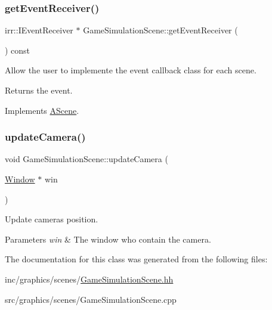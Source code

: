 \subsubsection{\texorpdfstring{get\+Event\+Receiver()}{getEventReceiver()}}
{\footnotesize\ttfamily irr\+::\+I\+Event\+Receiver $\ast$ Game\+Simulation\+Scene\+::get\+Event\+Receiver (\begin{DoxyParamCaption}{ }\end{DoxyParamCaption}) const\hspace{0.3cm}{\ttfamily [virtual]}}



Allow the user to implemente the event callback class for each scene. 

\begin{DoxyReturn}{Returns}
the event. 
\end{DoxyReturn}


Implements \hyperlink{classAScene_af521e5e6d30a5d2e5d30eb333e4d3abd}{A\+Scene}.

\mbox{\label{classGameSimulationScene_a66b107f708b5eed87a3c0a0016541d29}} 
\subsubsection{\texorpdfstring{update\+Camera()}{updateCamera()}}
{\footnotesize\ttfamily void Game\+Simulation\+Scene\+::update\+Camera (\begin{DoxyParamCaption}\item[{\hyperlink{classWindow}{Window} $\ast$}]{win }\end{DoxyParamCaption})}



Update camera\textquotesingle{}s position. 


\begin{DoxyParams}{Parameters}
{\em win} & The window who contain the camera. \\
\hline
\end{DoxyParams}


The documentation for this class was generated from the following files\+:\begin{DoxyCompactItemize}
\item 
inc/graphics/scenes/\hyperlink{GameSimulationScene_8hh}{Game\+Simulation\+Scene.\+hh}\item 
src/graphics/scenes/Game\+Simulation\+Scene.\+cpp\end{DoxyCompactItemize}
